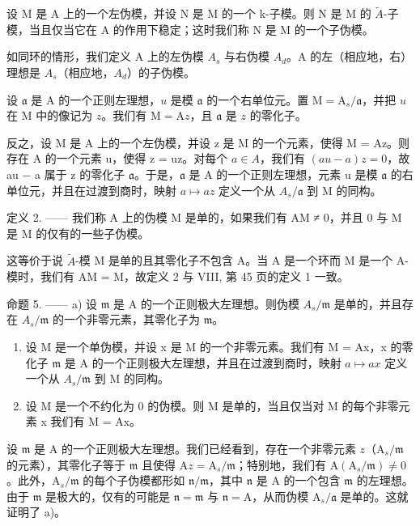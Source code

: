 设 M 是 A 上的一个左伪模，并设 N 是 M 的一个 k-子模。则 N 是 M 的 \(\widetilde{A}\)-子模，当且仅当它在 A 的作用下稳定；这时我们称 N 是 M 的一个子伪模。

如同环的情形，我们定义 A 上的左伪模 \(A_{s}\) 与右伪模 \(A_{d}\)。A 的左（相应地，右）理想是 \(A_{s}\)（相应地，\(A_{d}\)）的子伪模。

设 \(\mathfrak{a}\) 是 A 的一个正则左理想，\(u\) 是模 \(\mathfrak{a}\) 的一个右单位元。置 \(\mathrm{M} = \mathrm{A}_s / \mathfrak{a}\)，并把 \(u\) 在 M 中的像记为 \(z\)。我们有 \(\mathrm{M} = \mathrm{A}z\)，且 \(\mathfrak{a}\) 是 \(z\) 的零化子。

反之，设 M 是 A 上的一个左伪模，并设 z 是 M 的一个元素，使得 M = Az。则存在 A 的一个元素 u，使得 z = uz。对每个 \(a \in A\)，我们有 \((au - a)z = 0\)，故 au − a 属于 z 的零化子 \(\mathfrak{a}\)。于是，\(\mathfrak{a}\) 是 A 的一个正则左理想，元素 u 是模 \(\mathfrak{a}\) 的右单位元，并且在过渡到商时，映射 \(a \mapsto az\) 定义一个从 \(A_{s}/\mathfrak{a}\) 到 M 的同构。

定义 2. —— 我们称 A 上的伪模 M 是单的，如果我们有 AM ≠ 0，并且 0 与 M 是 M 的仅有的一些子伪模。

这等价于说 \(\tilde{A}\)-模 M 是单的且其零化子不包含 A。当 A 是一个环而 M 是一个 A-模时，我们有 AM = M，故定义 2 与 VIII, 第 45 页的定义 1 一致。

命题 5. —— a) 设 \(\mathfrak{m}\) 是 A 的一个正则极大左理想。则伪模 \(A_s / \mathfrak{m}\) 是单的，并且存在 \(A_s / \mathfrak{m}\) 的一个非零元素，其零化子为 \(\mathfrak{m}\)。

\begin{enumerate}
\def\labelenumi{\alph{enumi})}
\setcounter{enumi}{1}
\item
  设 M 是一个单伪模，并设 x 是 M 的一个非零元素。我们有 M = Ax，x 的零化子 \(\mathfrak{m}\) 是 A 的一个正则极大左理想，并且在过渡到商时，映射 \(a \mapsto ax\) 定义一个从 \(A_{s}/\mathfrak{m}\) 到 M 的同构。
\item
  设 M 是一个不约化为 0 的伪模。则 M 是单的，当且仅当对 M 的每个非零元素 x 我们有 M = Ax。
\end{enumerate}

设 \(\mathfrak{m}\) 是 A 的一个正则极大左理想。我们已经看到，存在一个非零元素 \(z\)（\(\mathrm{A}_s / \mathfrak{m}\) 的元素），其零化子等于 \(\mathfrak{m}\) 且使得 \(\mathrm{A}z = \mathrm{A}_s / \mathfrak{m}\)；特别地，我们有 \(\mathrm{A}(\mathrm{A}_s / \mathfrak{m}) \neq 0\)。此外，\(\mathrm{A}_s / \mathfrak{m}\) 的每个子伪模都形如 \(\mathfrak{n} / \mathfrak{m}\)，其中 \(\mathfrak{n}\) 是 A 的一个包含 \(\mathfrak{m}\) 的左理想。由于 \(\mathfrak{m}\) 是极大的，仅有的可能是 \(\mathfrak{n} = \mathfrak{m}\) 与 \(\mathfrak{n} = \mathrm{A}\)，从而伪模 \(\mathrm{A}_s / \mathfrak{a}\) 是单的。这就证明了 a)。

